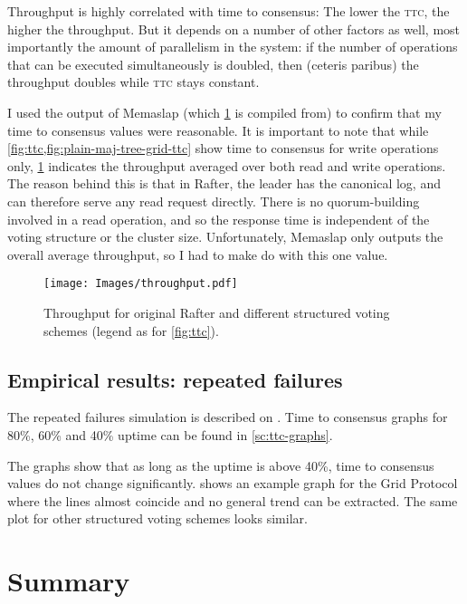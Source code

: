 \documentclass[12pt,chapterprefix=true,toc=bibliography,numbers=noendperiod,
               footnotes=multiple,twoside]{scrreprt}
\begin{document}

Throughput is highly correlated with time to consensus: The lower the \textsc{ttc}, the higher the throughput. But it depends on a number of other factors as well, most importantly the amount of parallelism in the system: if the number of operations that can be executed simultaneously is doubled, then (ceteris paribus) the throughput doubles while \textsc{ttc} stays constant.

I used the output of Memaslap (which \cref{fig:throughput} is compiled from) to confirm that my time to consensus values were reasonable. It is important to note that while \cref{fig:ttc,fig:plain-maj-tree-grid-ttc} show time to consensus for write operations only, \cref{fig:throughput} indicates the throughput averaged over both read and write operations. The reason behind this is that in Rafter, the leader has the canonical log, and can therefore serve any read request directly. There is no quorum-building involved in a read operation, and so the response time is independent of the voting structure or the cluster size. Unfortunately, Memaslap only outputs the overall average throughput, so I had to make do with this one value.

\begin{figure}[p]
    \centering
    \texttt{[image: Images/throughput.pdf]}
    \caption{Throughput for original Rafter and different structured voting schemes (legend as for \cref{fig:ttc}).}
    \label{fig:throughput}
\end{figure}

\subsection{Empirical results: repeated failures}
\label{ssc:repeated-failures}

The repeated failures simulation is described on . Time to consensus graphs for 80\%, 60\% and 40\% uptime can be found in \cref{sc:ttc-graphs}.

The graphs show that as long as the uptime is above 40\%, time to consensus values do not change significantly.  shows an example graph for the Grid Protocol where the lines almost coincide and no general trend can be extracted. The same plot for other structured voting schemes looks similar.

\section{Summary}
\end{document}
